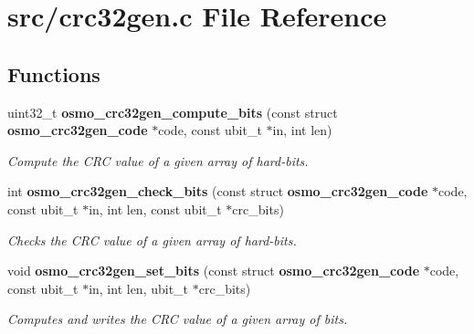 \section{src/crc32gen.c File Reference}
\label{crc32gen_8c}
\subsection*{Functions}
\begin{DoxyCompactItemize}
\item 
uint32\-\_\-t {\bf osmo\-\_\-crc32gen\-\_\-compute\-\_\-bits} (const struct {\bf osmo\-\_\-crc32gen\-\_\-code} $\ast$code, const ubit\-\_\-t $\ast$in, int len)
\begin{DoxyCompactList}\small\item\em Compute the C\-R\-C value of a given array of hard-\/bits. \end{DoxyCompactList}\item 
int {\bf osmo\-\_\-crc32gen\-\_\-check\-\_\-bits} (const struct {\bf osmo\-\_\-crc32gen\-\_\-code} $\ast$code, const ubit\-\_\-t $\ast$in, int len, const ubit\-\_\-t $\ast$crc\-\_\-bits)
\begin{DoxyCompactList}\small\item\em Checks the C\-R\-C value of a given array of hard-\/bits. \end{DoxyCompactList}\item 
void {\bf osmo\-\_\-crc32gen\-\_\-set\-\_\-bits} (const struct {\bf osmo\-\_\-crc32gen\-\_\-code} $\ast$code, const ubit\-\_\-t $\ast$in, int len, ubit\-\_\-t $\ast$crc\-\_\-bits)
\begin{DoxyCompactList}\small\item\em Computes and writes the C\-R\-C value of a given array of bits. \end{DoxyCompactList}\end{DoxyCompactItemize}
